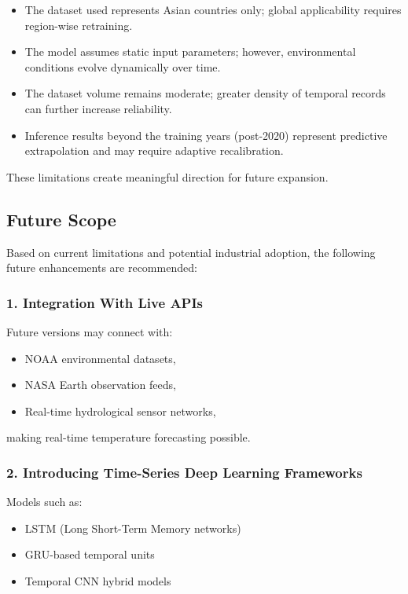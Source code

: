 \documentclass[12pt, a4paper]{article}
\begin{document}
\begin{itemize}
    \item The dataset used represents Asian countries only; global applicability requires region-wise retraining.
    \item The model assumes static input parameters; however, environmental conditions evolve dynamically over time.
    \item The dataset volume remains moderate; greater density of temporal records can further increase reliability.
    \item Inference results beyond the training years (post-2020) represent predictive extrapolation and may require adaptive recalibration.
\end{itemize}

These limitations create meaningful direction for future expansion.


\subsection{\textbf{Future Scope}}

Based on current limitations and potential industrial adoption, the following future enhancements are recommended:

\subsubsection*{1. Integration With Live APIs}
Future versions may connect with:

\begin{itemize}
    \item NOAA environmental datasets,
    \item NASA Earth observation feeds,
    \item Real-time hydrological sensor networks,
\end{itemize}

making real-time temperature forecasting possible.

\subsubsection*{2. Introducing Time-Series Deep Learning Frameworks}
Models such as:

\begin{itemize}
    \item LSTM (Long Short-Term Memory networks)
    \item GRU-based temporal units
    \item Temporal CNN hybrid models
\end{itemize}
\end{document}
